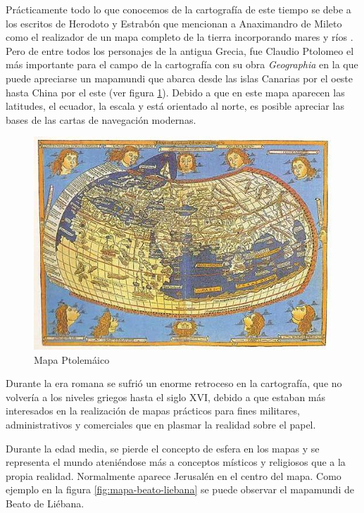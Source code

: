 Prácticamente todo lo que conocemos de la cartografía de este tiempo se debe a los escritos de Herodoto y Estrabón que mencionan a Anaximandro de Mileto como el realizador de un mapa completo de la tierra incorporando mares y ríos \cite{Kap10}. Pero de entre todos los personajes de la antigua Grecia, fue Claudio Ptolomeo el más importante para el campo de la cartografía con su obra \textit{Geographia} en la que puede apreciarse un mapamundi que abarca desde las islas Canarias por el oeste hasta China por el este (ver figura \ref{fig:mapa-ptolomeo}). Debido a que en este mapa aparecen las latitudes, el ecuador, la escala y está orientado al norte, es posible apreciar las bases de las cartas de navegación modernas.

\begin{figure}[h!btp]
\centering
\includegraphics[width=120mm, fbox={\fboxrule} 0mm]{images/03-antecedentes/33-mapa_ptolomeo.jpg}
\caption{Mapa Ptolemáico}
\label{fig:mapa-ptolomeo}
\end{figure}

Durante la era romana se sufrió un enorme retroceso en la cartografía, que no volvería a los niveles griegos hasta el siglo XVI, debido a que estaban más interesados en la realización de mapas prácticos para fines militares, administrativos y comerciales que en plasmar la realidad sobre el papel.

Durante la edad media, se pierde el concepto de esfera en los mapas y se representa el mundo ateniéndose más a conceptos místicos y religiosos que a la propia realidad. Normalmente aparece Jerusalén en el centro del mapa. Como ejemplo en la figura \ref{fig:mapa-beato-liebana} se puede observar el mapamundi de Beato de Liébana.

